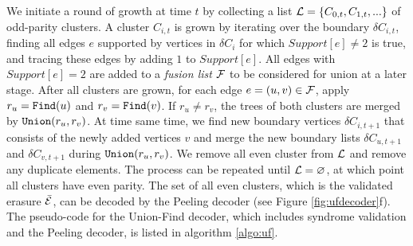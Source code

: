We initiate a round of growth at time $t$ by collecting a list $\mathcal{L} = \{C_{0,t}, C_{1,t}, ...\}$ of odd-parity clusters. A cluster $C_{i,t}$ is grown by iterating over the boundary $\delta C_{i,t}$, finding all edges $e$ supported by vertices in $\delta C_i$ for which $Support[e]\neq 2$ is true, and tracing these edges by adding $1$ to $Support[e]$. All edges with $Support[e]=2$ are added to a \emph{fusion list} $\mathcal{F}$ to be considered for union at a later stage. After all clusters are grown, for each edge $e=(u,v) \in \mathcal{F}$, apply $r_u=\texttt{Find}(u)$ and $r_v=\texttt{Find}(v)$. If $r_u\neq r_v$, the trees of both clusters are merged by $\texttt{Union}(r_u,r_v)$. At time same time, we find new boundary vertices $\delta C_{i,t+1}$ that consists of the newly added vertices $v$ and merge the new boundary lists $\delta C_{u,t+1}$ and $\delta C_{v,t+1}$ during $\texttt{Union}(r_u,r_v)$. We remove all even cluster from $\mathcal{L}$ and remove any duplicate elements. The process can be repeated until $\mathcal{L}=\varnothing$, at which point all clusters have even parity. The set of all even clusters, which is the validated erasure $\bar{\mathcal{E}}$, can be decoded by the Peeling decoder (see Figure \ref{fig:ufdecoder}f). The pseudo-code for the Union-Find decoder, which includes syndrome validation and the Peeling decoder, is listed in algorithm \ref{algo:uf}. 




